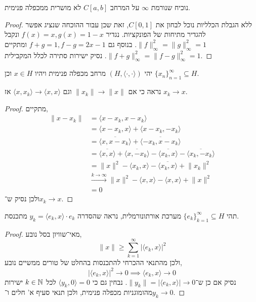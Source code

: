 \subquestion{}
נוכיח שנורמת $\infty$ על המרחב $C[a, b]$ לא מושרית ממכפלה פנימית.
\begin{proof}
	ללא הגבלת הכלליות נוכל לבחון את $C[0, 1]$, זאת שכן עבור ההוכחה שנציג אפשר להגדיר מתיחות של הפונקציות.
	נגדיר $f(x) = x, g(x) = 1 - x$ ונקבל $\lVert f \rVert_\infty^2 = \lVert g \rVert_\infty^2 = 1$.
	בנוסף גם $f + g = 1, f - g = 2x - 1$ ומתקיים $\lVert f + g \rVert_\infty^2 = \lVert f - g \rVert_\infty^2 = 1$.
	נסיק ישירות סתירה לכלל המקבילית.
\end{proof}

\question{}
יהי $(H, \langle \cdot, \cdot \rangle)$ מרחב מכפלה פנימית ויהיו $x \in H$ וכן ${\{ x_n \}}_{n = 1}^\infty \subseteq H$.

\subquestion{}
נראה כי אם $\lVert x_k \rVert \to \lVert x \rVert$ וגם $\langle x, x_k \rangle \to \langle x, x \rangle$ אז $x_k \to x$.
\begin{proof}
	מתקיים,
	\begin{align*}
		\lVert x - x_k \rVert
		& = \langle x - x_k, x - x_k \rangle \\
		& = \langle x - x_k, x \rangle + \langle x - x_k, -x_k \rangle \\
		& = \overline{\langle x, x - x_k \rangle} + \overline{\langle -x_k, x - x_k \rangle} \\
		& = \overline{\langle x, x \rangle} + \overline{\langle x, -x_k \rangle} - \overline{\langle x_k, x \rangle} - \overline{\langle x_k, -x_k \rangle} \\
		& = \lVert x \rVert^2 - \langle x_k, x \rangle - \overline{\langle x_k, x \rangle} + \lVert x_k \rVert^2 \\
		& \xrightarrow{k \to \infty} \lVert x \rVert^2 - \langle x, x \rangle - \langle x, x \rangle + \lVert x \rVert^2 \\
		& = 0
	\end{align*}
	ולכן נסיק ש־$x_k \to x$.
\end{proof}

\subquestion{}
תהי ${\{ e_k \}}_{k = 1}^\infty \subseteq H$ מערכת אורתונורמלית,
נראה שהסדרה $y_k = \langle e_k, x \rangle \cdot e_k$ מתכנסת.
\begin{proof}
	מאי־שוויון בסל נובע,
	\[
		\lVert x \rVert
		\ge \sum_{k = 1}^\infty {|\langle e_k, x \rangle|}^2
	\]
	ולכן מהתנאי ההכרחי להתכנסות בהחלט של טורים ממשיים נובע,
	\[
		{|\langle e_k, x \rangle|}^2
		\to 0
		\implies \langle e_k, x \rangle \to 0
	\]
	נסיק אם כן ש־$\lVert y_k \rVert = |\langle e_k, x \rangle| \to 0$.
	נבחין גם כי $\langle y_k, 0 \rangle = 0$ לכל $k \in \mathbb{N}$ ישירות מהומוגניות מכפלה פנימית, ולכן תנאי סעיף א' חלים ו־$y_k \to 0$.
\end{proof}

